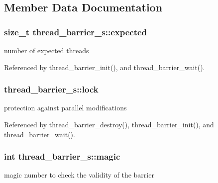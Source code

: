 \subsection{Member Data Documentation}
\hypertarget{structthread__barrier__s_a49aeee62a81db234144e01be301540ef}{
\subsubsection[{expected}]{\setlength{\rightskip}{0pt plus 5cm}size\-\_\-t thread\-\_\-barrier\-\_\-s\-::expected}}\label{structthread__barrier__s_a49aeee62a81db234144e01be301540ef}


number of expected threads 



Referenced by thread\-\_\-barrier\-\_\-init(), and thread\-\_\-barrier\-\_\-wait().

\hypertarget{structthread__barrier__s_a8bbb69142ae57e50b5c83c31a8b00138}{
\subsubsection[{lock}]{ thread\-\_\-barrier\-\_\-s\-::lock}}\label{structthread__barrier__s_a8bbb69142ae57e50b5c83c31a8b00138}


protection against parallel modifications 



Referenced by thread\-\_\-barrier\-\_\-destroy(), thread\-\_\-barrier\-\_\-init(), and thread\-\_\-barrier\-\_\-wait().

\hypertarget{structthread__barrier__s_a0ca24d9e62459d13238ea86bbb85c61c}{
\subsubsection[{magic}]{\setlength{\rightskip}{0pt plus 5cm}int thread\-\_\-barrier\-\_\-s\-::magic}}\label{structthread__barrier__s_a0ca24d9e62459d13238ea86bbb85c61c}


magic number to check the validity of the barrier 



